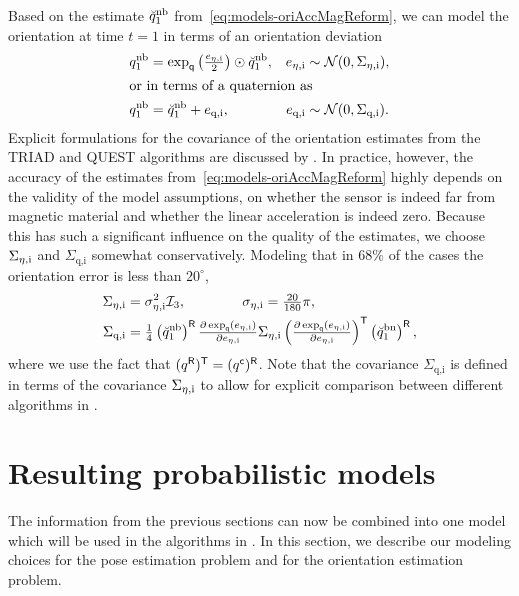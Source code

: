 Based on the estimate $\breve{q}_1^\text{nb}$ from~\eqref{eq:models-oriAccMagReform}, we can model the orientation at time $t = 1$ in terms of an orientation deviation
\begin{subequations}
\begin{align}
q_1^\text{nb} &= \exp_\mathsf{q} \left( \tfrac{e_{\eta,\text{i}}}{2} \right) \odot \breve{q}_1^\text{nb},  & e_{\eta,\text{i}} &\sim \mathcal{N}(0, \Sigma_{\eta,\text{i}}), \\
\intertext{or in terms of a quaternion as}
q_1^\text{nb} &= \breve{q}_1^\text{nb} + e_\text{q,i},  & e_\text{q,i} &\sim \mathcal{N}(0, \Sigma_\text{q,i}) .
\end{align}
\end{subequations}
Explicit formulations for the covariance of the orientation estimates from the TRIAD and QUEST algorithms are discussed by \cite{shuster:2006}. In practice, however, the accuracy of the estimates from~\eqref{eq:models-oriAccMagReform} highly depends on the validity of the model assumptions, \ie on whether the sensor is indeed far from magnetic material and whether the linear acceleration is indeed zero. Because this has such a significant influence on the quality of the estimates, we choose $\Sigma_{\eta,\text{i}}$ and $\Sigma_\text{q,i}$ somewhat conservatively. Modeling that in $68 \%$ of the cases the orientation error is less than $20^\circ$, 
\begin{subequations}
\begin{align}
\Sigma_{\eta,\text{i}} &= \sigma_{\eta, \text{i}}^2 \mathcal{I}_3, \qquad \qquad \sigma_{\eta,\text{i}} = \tfrac{20}{180} \pi, \\
\Sigma_{\text{q,i}} &= \tfrac{1}{4} \left( \breve{q}_1^\text{nb} \right)^{\mathsf{R}} \tfrac{\partial \exp_\mathsf{q} (e_{\eta,\text{i}})}{\partial e_{\eta,\text{i}}} \Sigma_{\eta,\text{i}} \left( \tfrac{\partial \exp_\mathsf{q} (e_{\eta,\text{i}})}{\partial e_{\eta,\text{i}}} \right)^{\mathsf{T}} \left( \breve{q}_1^\text{bn} \right)^{\mathsf{R}},
\end{align}
\end{subequations}
where we use the fact that $( q^{\mathsf{R}} )^{\mathsf{T}} = (q^{\mathsf{c}})^{\mathsf{R}}$. Note that the covariance $\Sigma_{\text{q,i}}$ is defined in terms of the covariance $\Sigma_{\eta,\text{i}}$ to allow for explicit comparison between different algorithms in .

\section{Resulting probabilistic models}
\label{sec:models-resultingProbModel}
The information from the previous sections can now be combined into one model which will be used in the algorithms in . In this section, we describe our modeling choices for the pose estimation problem and for the orientation estimation problem. 

